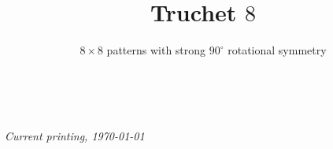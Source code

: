 \documentclass{tufte-book}
\title{Truchet $8$}
\subtitle{$8\times 8$ patterns with strong $90^{\circ}$ rotational symmetry}
\author[]{}
\begin{document}
\maketitle


\newpage
\begin{fullwidth}
~\vfill
\thispagestyle{empty}
\setlength{\parindent}{0pt}
\setlength{\parskip}{\baselineskip}

\par\textit{Current printing, \today}
\end{fullwidth}

\cleardoublepage

\setlength{\tabcolsep}{0pt}
\renewcommand{\arraystretch}{0}


\backmatter
\nocite{*}


\end{document}
